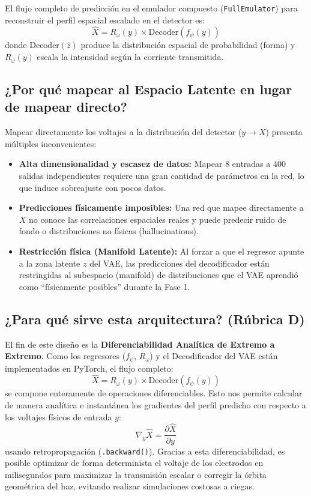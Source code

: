 \documentclass[12pt,letterpaper]{article}
\begin{document}
El flujo completo de predicción en el emulador compuesto (\texttt{FullEmulator}) para reconstruir el perfil espacial escalado en el detector es:
\begin{equation}
    \hat{X} = R_\omega(y) \times \text{Decoder}(f_\psi(y))
\end{equation}
donde $\text{Decoder}(\hat{z})$ produce la distribución espacial de probabilidad (forma) y $R_\omega(y)$ escala la intensidad según la corriente transmitida.

\subsection{¿Por qué mapear al Espacio Latente en lugar de mapear directo?}
Mapear directamente los voltajes a la distribución del detector ($y \to X$) presenta múltiples inconvenientes:
\begin{itemize}
    \item \textbf{Alta dimensionalidad y escasez de datos:} Mapear 8 entradas a 400 salidas independientes requiere una gran cantidad de parámetros en la red, lo que induce sobreajuste con pocos datos.
    \item \textbf{Predicciones físicamente imposibles:} Una red que mapee directamente a $X$ no conoce las correlaciones espaciales reales y puede predecir ruido de fondo o distribuciones no físicas (hallucinations).
    \item \textbf{Restricción física (Manifold Latente):} Al forzar a que el regresor apunte a la zona latente $z$ del VAE, las predicciones del decodificador están restringidas al subespacio (manifold) de distribuciones que el VAE aprendió como ``físicamente posibles'' durante la Fase 1.
\end{itemize}

\subsection{¿Para qué sirve esta arquitectura? (Rúbrica D)}
El fin de este diseño es la \textbf{Diferenciabilidad Analítica de Extremo a Extremo}. Como los regresores ($f_\psi$, $R_\omega$) y el Decodificador del VAE están implementados en PyTorch, el flujo completo:
\begin{equation}
    \hat{X} = R_\omega(y) \times \text{Decoder}(f_\psi(y))
\end{equation}
se compone enteramente de operaciones diferenciables. Esto nos permite calcular de manera analítica e instantánea los gradientes del perfil predicho con respecto a los voltajes físicos de entrada $y$:
\begin{equation}
    \nabla_y \hat{X} = \frac{\partial \hat{X}}{\partial y}
\end{equation}
usando retropropagación (\texttt{.backward()}). Gracias a esta diferenciabilidad, es posible optimizar de forma determinista el voltaje de los electrodos en milisegundos para maximizar la transmisión escalar o corregir la órbita geométrica del haz, evitando realizar simulaciones costosas a ciegas.
\end{document}
